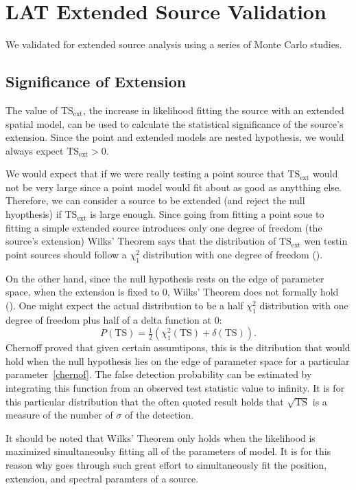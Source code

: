 \documentclass[12pt,preprint]{aastex}
\newcommand{\tsext}{{\ensuremath{\text{TS}_\text{ext}}}\xspace}
\newcommand{\ts}{\text{TS}\xspace}
\newcommand{\pointlike}{\text{\em pointlike}\xspace}
\begin{document}
\section{LAT Extended Source Validation}

We validated \pointlike for extended source
analysis using a series of Monte Carlo studies.

\subsection{Significance of Extension}
\label{significance_of_extension}

The value of \tsext, the increase in likelihood fitting the source
with an extended spatial model, can be used to calculate
the statistical significance of the source's extension.
Since the point and extended models are nested hypothesis,
we would always expect $\tsext>0$.

We would expect that if we were really testing a point source that
\tsext would not be very large since a point model would fit about
as good as anytthing else. Therefore, we can consider a source to be
extended (and reject the null hyopthesis) if \tsext is large enough.
Since going from fitting a point soue to fitting a simple extended
source introduces only one degree of freedom (the source's extension)
Wilks' Theorem says that the distribution of $\tsext$ wen testin
point sources should follow a $\chi^2_1$ distribution with one degree
of freedom (\cite{wilks_theorem}).

On the other hand, since the null hypothesis rests on the edge of
parameter space, when the extension is fixed to 0, Wilks' Theorem does
not formally hold (\cite{warn_wilks_theorem}).  One might
expect the actual distribution to be a half $\chi^2_1$ distribution with
one degree of freedom plus half of a delta function at 0:
\begin{equation}
  P(\ts)=\tfrac{1}{2}(\chi^2_1(\ts)+\delta(\ts)).
\end{equation}
Chernoff proved that given certain assumtipons, this is
the ditribution that would hold when the null hypothesis
lies on the edge of parameter space for a particular parameter~\ref{chernof}.
The false detection probability can be estimated by integrating this function 
from an observed test statistic value to infinity. It is for this
particular distribution that the often quoted result holds that
$\sqrt{\ts}$ is a measure of the number of $\sigma$ of the detection.

It should be noted that Wilks' Theorem only holds when the likelihood
is maximized simultaneoulsy fitting all of the parameters of model. It
is for this reason why \pointlike goes through such great effort to
simultaneously fit the position, extension, and spectral paramters of
a source.
\end{document}
